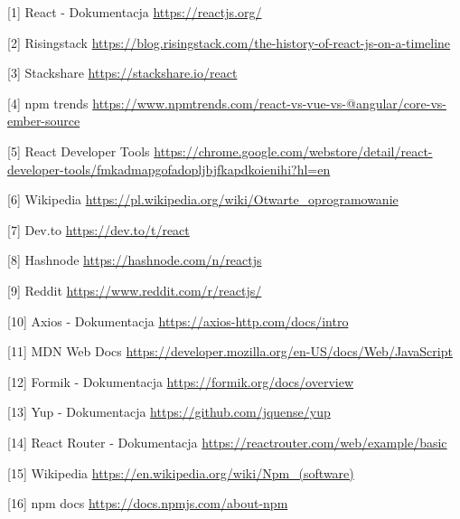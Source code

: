 \documentclass[oneside,polski,logo,indent]{amuthesis}
\begin{document}
\begin{enumerate}
\begin{enumerate}
\hypertarget{[1]}{[1] React - Dokumentacja \url{https://reactjs.org/}}
\newline
\hypertarget{[2]}{[2] Risingstack \url{https://blog.risingstack.com/the-history-of-react-js-on-a-timeline}}
\newline
\hypertarget{[3]}{[3] Stackshare \url{https://stackshare.io/react}}
\newline
\hypertarget{[4]}{[4] npm trends \url{https://www.npmtrends.com/react-vs-vue-vs-@angular/core-vs-ember-source}}
\newline
\hypertarget{[5]}{[5] React Developer Tools \url{https://chrome.google.com/webstore/detail/react-developer-tools/fmkadmapgofadopljbjfkapdkoienihi?hl=en}}
\newline
\hypertarget{[6]}{[6] Wikipedia \url{https://pl.wikipedia.org/wiki/Otwarte_oprogramowanie}}
\newline
\hypertarget{[7]}{[7] Dev.to \url{https://dev.to/t/react}}
\newline
\hypertarget{[8]}{[8] Hashnode \url{https://hashnode.com/n/reactjs}}
\newline
\hypertarget{[9]}{[9] Reddit \url{https://www.reddit.com/r/reactjs/}}
\newline
\hypertarget{[10]}{[10] Axios - Dokumentacja \url{https://axios-http.com/docs/intro}}
\newline
\hypertarget{[11]}{[11] MDN Web Docs \url{https://developer.mozilla.org/en-US/docs/Web/JavaScript}}
\newline
\hypertarget{[12]}{[12] Formik - Dokumentacja \url{https://formik.org/docs/overview}}
\newline
\hypertarget{[13]}{[13] Yup - Dokumentacja \url{https://github.com/jquense/yup}}
\newline
\hypertarget{[14]}{[14] React Router - Dokumentacja \url{https://reactrouter.com/web/example/basic}}
\newline
\hypertarget{[15]}{[15] Wikipedia \url{https://en.wikipedia.org/wiki/Npm_(software)}}
\newline
\hypertarget{[16]}{[16] npm docs \url{https://docs.npmjs.com/about-npm}}
\newline

\end{enumerate}
\end{enumerate}
\end{document}
